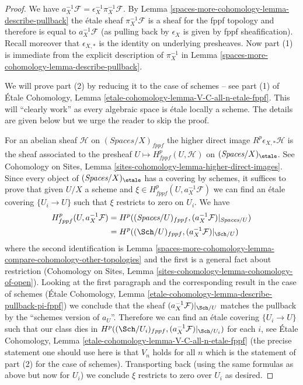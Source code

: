 \begin{proof}
We have $a_X^{-1}\mathcal{F} = \epsilon_X^{-1} \pi_X^{-1}\mathcal{F}$.
By Lemma \ref{spaces-more-cohomology-lemma-describe-pullback} the \'etale sheaf
$\pi_X^{-1}\mathcal{F}$ is a sheaf for the fppf topology
and therefore is equal to $a_X^{-1}\mathcal{F}$ (as pulling
back by $\epsilon_X$ is given by fppf sheafification).
Recall moreover that $\epsilon_{X, *}$ is the identity
on underlying presheaves.
Now part (1) is immediate from the explicit description of $\pi_X^{-1}$
in Lemma \ref{spaces-more-cohomology-lemma-describe-pullback}.

\medskip\noindent
We will prove part (2) by reducing it to the case of schemes --
see part (1) of
\'Etale Cohomology, Lemma \ref{etale-cohomology-lemma-V-C-all-n-etale-fppf}.
This will ``clearly work'' as every algebraic space is
\'etale locally a scheme. The details are given below but we urge
the reader to skip the proof.

\medskip\noindent
For an abelian sheaf $\mathcal{H}$ on $(\textit{Spaces}/X)_{fppf}$ the
higher direct image $R^p\epsilon_{X, *}\mathcal{H}$ is the sheaf
associated to the presheaf $U \mapsto H^p_{fppf}(U, \mathcal{H})$
on $(\textit{Spaces}/X)_\etale$. See
Cohomology on Sites, Lemma \ref{sites-cohomology-lemma-higher-direct-images}.
Since every object of $(\textit{Spaces}/X)_\etale$ has a covering
by schemes, it suffices to prove that given $U/X$ a scheme and
$\xi \in H^p_{fppf}(U, a_X^{-1}\mathcal{F})$ we can find
an \'etale covering $\{U_i \to U\}$ such that $\xi$
restricts to zero on $U_i$. We have
\begin{align*}
H^p_{fppf}(U, a_X^{-1}\mathcal{F})
& =
H^p((\textit{Spaces}/U)_{fppf}, (a_X^{-1}\mathcal{F})|_{\textit{Spaces}/U}) \\
& =
H^p((\Sch/U)_{fppf}, (a_X^{-1}\mathcal{F})|_{\Sch/U})
\end{align*}
where the second identification is
Lemma \ref{spaces-more-cohomology-lemma-compare-cohomology-other-topologies}
and the first is a general fact about restriction
(Cohomology on Sites, Lemma \ref{sites-cohomology-lemma-cohomology-of-open}).
Looking at the first paragraph and the corresponding result in the
case of schemes (\'Etale Cohomology, Lemma
\ref{etale-cohomology-lemma-describe-pullback-pi-fppf})
we conclude that the sheaf $(a_X^{-1}\mathcal{F})|_{\Sch/U}$
matches the pullback by the ``schemes version of $a_U$''.
Therefore we can find an \'etale covering
$\{U_i \to U\}$ such that our class dies in
$H^p((\Sch/U_i)_{fppf}, (a_X^{-1}\mathcal{F})|_{\Sch/U_i})$
for each $i$, see
\'Etale Cohomology, Lemma \ref{etale-cohomology-lemma-V-C-all-n-etale-fppf}
(the precise statement one should use here is that $V_n$ holds for all $n$
which is the statement of part (2) for the case of schemes).
Transporting back (using the same formulas as above but now for
$U_i$) we conclude $\xi$ restricts to zero over $U_i$ as desired.
\end{proof}


